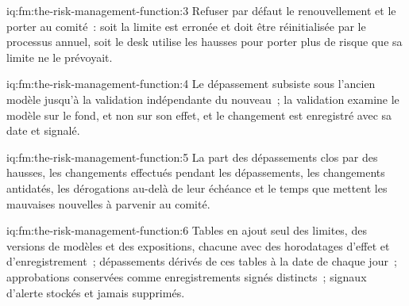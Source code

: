 \begin{solution}{iq:fm:the-risk-management-function:3}
Refuser par défaut le renouvellement et le porter au comité~: soit la limite est erronée et doit être réinitialisée par le processus annuel, soit le desk
utilise les hausses pour porter plus de risque que sa limite ne le prévoyait.
\end{solution}

\begin{solution}{iq:fm:the-risk-management-function:4}
Le dépassement subsiste sous l'ancien modèle jusqu'à la validation indépendante du nouveau~; la validation examine le modèle sur le fond, et non sur son effet,
et le changement est enregistré avec sa date et signalé.
\end{solution}

\begin{solution}{iq:fm:the-risk-management-function:5}
La part des dépassements clos par des hausses, les changements effectués pendant les dépassements, les changements antidatés, les dérogations au-delà de leur échéance et le temps que mettent les mauvaises
nouvelles à parvenir au comité.
\end{solution}

\begin{solution}{iq:fm:the-risk-management-function:6}
Tables en ajout seul des limites, des versions de modèles et des expositions, chacune avec des horodatages d'effet et d'enregistrement~; dépassements dérivés de ces tables à la
date de chaque jour~; approbations conservées comme enregistrements signés distincts~; signaux d'alerte stockés et jamais supprimés.
\end{solution}
